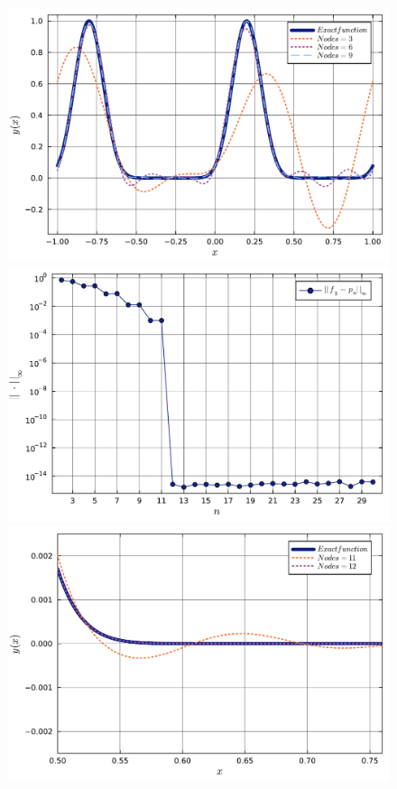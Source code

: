 \documentclass[letterpaper, 12pt]{article}
\numberwithin{equation}{section}    %
\begin{document}
\begin{figure}[!ht]
    \centering
    \begin{minipage}[b]{0.47\textwidth}
        \includegraphics[width=\textwidth]{4615.pdf}
    \end{minipage}
    \hspace{0.5cm}
    \begin{minipage}[b]{0.47\textwidth}
        \includegraphics[width=\textwidth]{4616.pdf}
    \end{minipage}
    \begin{minipage}[b]{0.47\textwidth}
        \includegraphics[width=\textwidth]{4617.pdf}

\end{minipage}
\end{figure}
\end{document}
